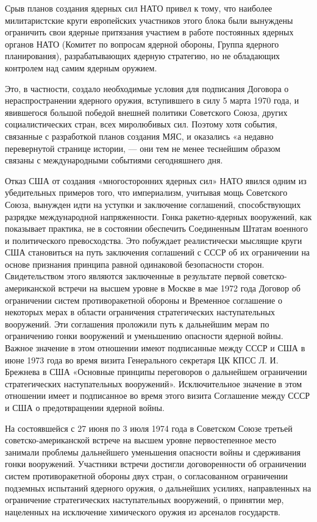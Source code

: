 \documentclass[12pt, a4paper, openany]{book}
\begin{document}
Срыв планов создания ядерных сил НАТО привел к тому, что наиболее милитаристские круги европейских участников этого блока были вынуждены ограничить свои ядерные притязания участием в работе постоянных ядерных органов НАТО (Комитет по вопросам ядерной обороны, Группа ядерного планирования), разрабатывающих ядерную стратегию, но не обладающих контролем над самим ядерным оружием.

Это, в частности, создало необходимые условия для подписания Договора о нераспространении ядерного оружия, вступившего в силу 5 марта 1970 года, и явившегося большой победой внешней политики Советского Союза, других социалистических стран, всех миролюбивых сил. Поэтому хотя события, связанные с разработкой планов создания МЯС, и оказались «а недавно перевернутой странице истории, — они тем не менее теснейшим образом связаны с международными событиями сегодняшнего дня.

Отказ США от создания «многосторонних ядерных сил» НАТО явился одним из убедительных примеров того, что империализм, учитывая мощь Советского Союза, вынужден идти на уступки и заключение соглашений, способствующих разрядке международной напряженности. Гонка ракетно-ядерных вооружений, как показывает практика, не в состоянии обеспечить Соединенным Штатам военного и политического превосходства. Это побуждает реалистически мыслящие круги США становиться на путь заключения соглашений с СССР об их ограничении на основе признания принципа равной одинаковой безопасности сторон. Свидетельством этого являются заключенные в результате первой советско-американской встречи на высшем уровне в Москве в мае 1972 года Договор об ограничении систем противоракетной обороны и Временное соглашение о некоторых мерах в области ограничения стратегических наступательных вооружений. Эти соглашения проложили путь к дальнейшим мерам по ограничению гонки вооружений и уменьшению опасности ядерной войны. Важное значение в этом отношении имеют подписанные между СССР и США в июне 1973 года во время визита Генерального секретаря ЦК КПСС Л. И. Брежнева в США «Основные принципы переговоров о дальнейшем ограничении стратегических наступательных вооружений». Исключительное значение в этом отношении имеет и подписанное во время этого визита Соглашение между СССР и США о предотвращении ядерной войны.

На состоявшейся с 27 июня по 3 июля 1974 года в Советском Союзе третьей советско-американской встрече на высшем уровне первостепенное место занимали проблемы дальнейшего уменьшения опасности войны и сдерживания гонки вооружений. Участники встречи достигли договоренности об ограничении систем противоракетной обороны двух стран, о согласованном ограничении подземных испытаний ядерного оружия, о дальнейших усилиях, направленных на ограничение стратегических наступательных вооружений, о принятии мер, нацеленных на исключение химического оружия из арсеналов государств.
\end{document}
